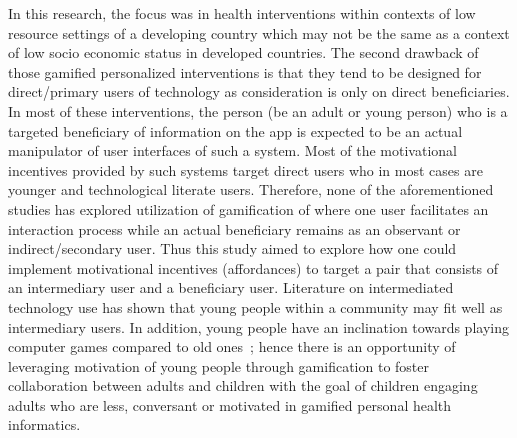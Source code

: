 In this research, the focus was in health interventions within contexts of low resource settings of a developing country which may not be the same as a context of low socio economic status in developed countries. The second drawback of those gamified personalized interventions is that they tend to be designed for direct/primary users of technology as consideration is only on direct beneficiaries. In most of these interventions, the person (be an adult or young person) who is a targeted beneficiary of information on the app is expected to be an actual manipulator of user interfaces of such a system. Most of the motivational incentives provided by such systems target direct users who in most cases are younger and technological literate users. Therefore, none of the aforementioned studies has explored utilization of gamification of where one user facilitates an interaction process while an actual beneficiary remains as an observant or indirect/secondary user. Thus this study aimed to explore how one could implement motivational incentives (affordances) to target a pair that consists of an intermediary user and a beneficiary user. Literature on intermediated technology use has shown that young people within a community may fit well as intermediary users. In addition, young people have an inclination towards playing computer games compared to old ones~\citep{brauner2013increase}; hence there is an opportunity of leveraging  motivation of young people through gamification to foster collaboration between adults and children with the goal of children engaging adults who are less, conversant or motivated in gamified personal health informatics. 

\begin{flushright}
\end{flushright}
